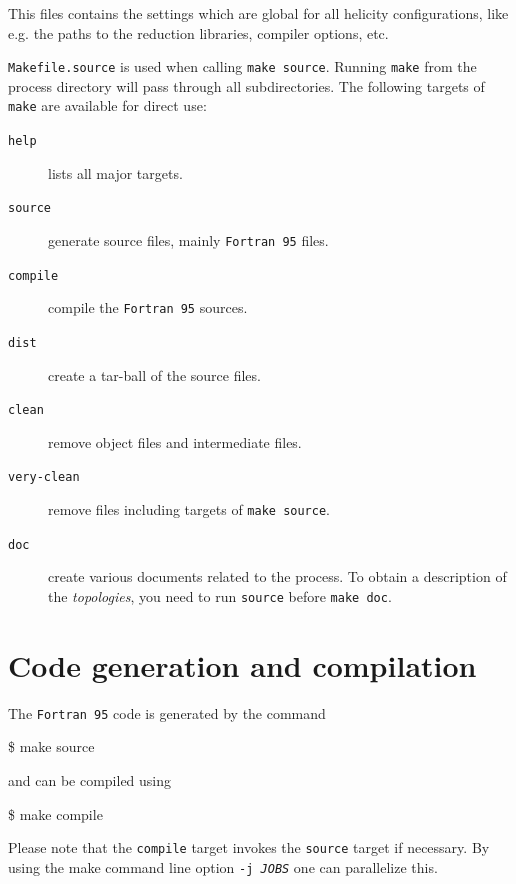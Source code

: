 \documentclass[11pt,a4paper]{refrep}
\newcommand{\form}{{\tt FORM}\xspace}
\newcommand{\fortranXC}{{\tt Fortran\,95}\xspace}
\begin{document}

 This files contains the settings
which are global for all helicity configurations, 
like e.g. the paths to the reduction libraries, compiler options, etc.

 \texttt{Makefile.source} is used when calling
\texttt{make source}. Running \texttt{make} from the process
directory will pass through all subdirectories. The following
targets of \texttt{make} are available for direct use:
\begin{description}
\item[\texttt{help}] lists all major targets.
\item[\texttt{source}] generate source files, mainly \fortranXC files.
\item[\texttt{compile}] compile the \fortranXC sources.
\item[\texttt{dist}] create a tar-ball of the source files.
\item[\texttt{clean}] remove object files and intermediate files.
\item[\texttt{very-clean}] remove files including targets of
                                \texttt{make source}.
\item[\texttt{doc}] create various documents related to the process.
      To obtain a description of the \emph{topologies}, you need to run
      \texttt{source} before \texttt{make doc}.
\end{description}

\section{Code generation and compilation}
The \fortranXC code is generated by the command
\begin{example}
\$ make source
\end{example}
and can be compiled using
\begin{example}
\$ make compile
\end{example}
Please note that the \texttt{compile} target invokes
the \texttt{source} target if necessary. By using the make command line option
\texttt{-j \it JOBS} one can parallelize this.
\end{document}
